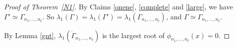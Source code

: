 \documentclass[12pt]{article}
\numberwithin{equation}{section}
\begin{document}
\begin{proof}[Proof of Theorem~\ref{N1}]
By Claims \ref{onene}, \ref{complete} and \ref{large}, we have $\Gamma'\simeq \Gamma_{n_1, \dots, n_t}$. 
So  $\lambda_1(\Gamma)=\lambda_1(\Gamma')=\lambda_1(\Gamma_{n_1, \dots, n_t})$, and $\Gamma\simeq \Gamma_{n_1, \dots, n_t}$.
%

By Lemma \ref{gnt}, 
$\lambda_1(\dot\Gamma_{n_1, \dots, n_t})$ is the largest root of $\phi_{n_1, \dots, n_t}(x)=0$. 
\end{proof}
\end{document}
